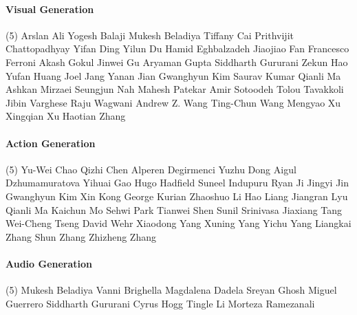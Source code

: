 \vspace{-0.32\baselineskip}\paragraph{\footnotesize Visual Generation} \mbox{}
\vspace{-0.32\baselineskip}
\begingroup
\footnotesize
\begin{tasks}[label=\relax, label-width=0pt, item-indent=4pt](5)
\task Arslan Ali
\task Yogesh Balaji 
\task Mukesh Beladiya
\task Tiffany Cai
\task Prithvijit Chattopadhyay 
\task Yifan Ding
\task Yilun Du 
\task Hamid Eghbalzadeh 
\task Jiaojiao Fan
\task Francesco Ferroni
\task Akash Gokul
\task Jinwei Gu
\task Aryaman Gupta
\task Siddharth Gururani 
\task Zekun Hao
\task Yufan Huang
\task Joel Jang 
\task Yanan Jian
\task Gwanghyun Kim 
\task Saurav Kumar
\task Qianli Ma
\task Ashkan Mirzaei 
\task Seungjun Nah
\task Mahesh Patekar
\task Amir Sotoodeh
\task Tolou Tavakkoli
\task Jibin Varghese
\task Raju Wagwani
\task Andrew Z. Wang
\task Ting-Chun Wang 
\task Mengyao Xu
\task Xingqian Xu
\task Haotian Zhang
\end{tasks}
\endgroup

\vspace{-0.32\baselineskip}\paragraph{\footnotesize Action Generation} \mbox{}
\vspace{-0.32\baselineskip}
\begingroup
\footnotesize
\begin{tasks}[label=\relax, label-width=0pt, item-indent=4pt](5)
\task Yu-Wei Chao 
\task Qizhi Chen 
\task Alperen Degirmenci 
\task Yuzhu Dong 
\task Aigul Dzhumamuratova 
\task Yihuai Gao 
\task Hugo Hadfield 
\task Suneel Indupuru 
\task Ryan Ji 
\task Jingyi Jin 
\task Gwanghyun Kim 
\task Xin Kong 
\task George Kurian 
\task Zhaoshuo Li 
\task Hao Liang 
\task Jiangran Lyu 
\task Qianli Ma 
\task Kaichun Mo 
\task Sehwi Park 
\task Tianwei Shen 
\task Sunil Srinivasa 
\task Jiaxiang Tang 
\task Wei-Cheng Tseng 
\task David Wehr 
\task Xiaodong Yang 
\task Xuning Yang 
\task Yichu Yang 
\task Liangkai Zhang 
\task Shun Zhang 
\task Zhizheng Zhang 
\end{tasks}
\endgroup

\vspace{-0.32\baselineskip}\paragraph{\footnotesize Audio Generation} \mbox{}
\vspace{-0.32\baselineskip}
\begingroup
\footnotesize
\begin{tasks}[label=\relax, label-width=0pt, item-indent=4pt](5)
\task Mukesh Beladiya
\task Vanni Brighella 
\task Magdalena Dadela 
\task Sreyan Ghosh
\task Miguel Guerrero 
\task Siddharth Gururani
\task Cyrus Hogg 
\task Tingle Li
\task Morteza Ramezanali 
\end{tasks}
\endgroup

